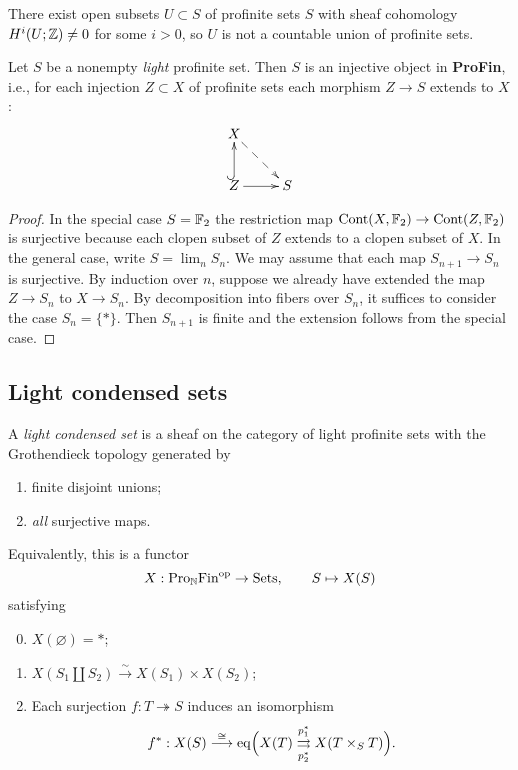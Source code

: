 \documentclass{notes}
\begin{document}
\begin{rem}
There exist open subsets $U\subset S$ of profinite sets $S$ with
sheaf cohomology $H^i(U;{\mathbb{Z}})\neq 0$ for some $i>0$, so $U$ is not 
a countable union of profinite sets.
\end{rem}

\begin{prop}
Let $S$ be a nonempty {\em light} profinite set. Then $S$ is an
injective object in {\bf ProFin}, i.e., for each injection $Z\subset
X$ of profinite sets each morphism $Z\to S$ extends to $X$: 
$$
\xymatrix{
  X \ar@{-->}[rd] \\ 
  Z \ar@{^{(}->}[u] \ar[r] & S
}
$$
\end{prop}

\begin{proof}
In the special case $S={\mathbb{F}}_2$ the restriction map
${\rm Cont}(X,{\mathbb{F}}_2)\to{\rm Cont}(Z,{\mathbb{F}}_2)$ is surjective because each clopen
subset of $Z$ extends to a clopen subset of $X$. 
In the general case, write $S=\lim_n S_n$. We may assume that each map
$S_{n+1}\to S_n$ is surjective. By induction over $n$, suppose we
already have extended the map $Z\to S_n$ to $X\to S_n$. By
decomposition into fibers over $S_n$, it suffices to consider the case
$S_n=\{*\}$. Then $S_{n+1}$ is finite and the extension follows
from the special case. 
\end{proof}

\subsection{Light condensed sets}

\begin{defi}
A {\em light condensed set} is a sheaf on the category of light
profinite sets with the Grothendieck topology generated by
\begin{enumerate}
\item finite disjoint unions;
\item {\em all} surjective maps.
\end{enumerate}
Equivalently, this is a functor 
$$
  X: \text{Pro}_{\mathbb{N}}\text{Fin}^{\rm op} \to \text{Sets},\qquad S\mapsto X(S)
$$
satisfying
\begin{enumerate}
\setcounter{enumi}{-1}
\item $X(\varnothing)=*$;
\item $X(S_1\amalg S_2)\stackrel{\sim}\longrightarrow X(S_1)\times X(S_2)$;
\item Each surjection $f:T\twoheadrightarrow S$ induces an isomorphism
$$
  f^*:X(S) \stackrel{\cong}\longrightarrow {\rm eq}\Bigl(X(T)
  \overset{p_1^*}{\underset{p_2^*}{\rightrightarrows}} X(T\times_ST)\Bigr).
$$
\end{enumerate}
\end{defi}
\end{document}
